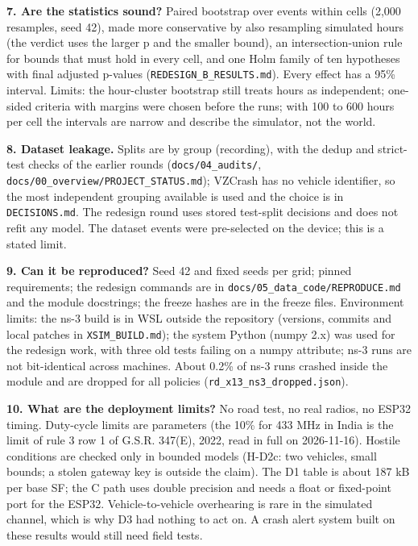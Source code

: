 \textbf{7. Are the statistics sound?}
Paired bootstrap over events within cells (2,000 resamples, seed 42), made more conservative by also resampling simulated hours (the verdict uses the larger p and the smaller bound), an intersection-union rule for bounds that must hold in every cell, and one Holm family of ten hypotheses with final adjusted p-values (\texttt{REDESIGN\_B\_RESULTS.md}). Every effect has a 95\% interval. Limits: the hour-cluster bootstrap still treats hours as independent; one-sided criteria with margins were chosen before the runs; with 100 to 600 hours per cell the intervals are narrow and describe the simulator, not the world.

\textbf{8. Dataset leakage.}
Splits are by group (recording), with the dedup and strict-test checks of the earlier rounds (\texttt{docs/04\_audits/}, \texttt{docs/00\_overview/PROJECT\_STATUS.md}); VZCrash has no vehicle identifier, so the most independent grouping available is used and the choice is in \texttt{DECISIONS.md}. The redesign round uses stored test-split decisions and does not refit any model. The dataset events were pre-selected on the device; this is a stated limit.

\textbf{9. Can it be reproduced?}
Seed 42 and fixed seeds per grid; pinned requirements; the redesign commands are in \texttt{docs/05\_data\_code/REPRODUCE.md} and the module docstrings; the freeze hashes are in the freeze files. Environment limits: the ns-3 build is in WSL outside the repository (versions, commits and local patches in \texttt{XSIM\_BUILD.md}); the system Python (numpy 2.x) was used for the redesign work, with three old tests failing on a numpy attribute; ns-3 runs are not bit-identical across machines. About 0.2\% of ns-3 runs crashed inside the module and are dropped for all policies (\texttt{rd\_x13\_ns3\_dropped.json}).

\textbf{10. What are the deployment limits?}
No road test, no real radios, no ESP32 timing. Duty-cycle limits are parameters (the 10\% for 433 MHz in India is the limit of rule 3 row 1 of G.S.R. 347(E), 2022, read in full on 2026-11-16). Hostile conditions are checked only in bounded models (H-D2c: two vehicles, small bounds; a stolen gateway key is outside the claim). The D1 table is about 187 kB per base SF; the C path uses double precision and needs a float or fixed-point port for the ESP32. Vehicle-to-vehicle overhearing is rare in the simulated channel, which is why D3 had nothing to act on. A crash alert system built on these results would still need field tests.


